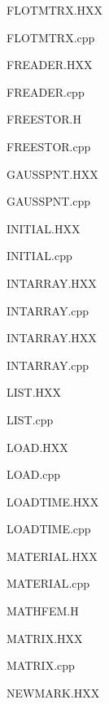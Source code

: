 \documentclass{article}
\begin{document}

% 
{\centering\sf  FLOTMTRX.HXX\\}

{\centering\sf  FLOTMTRX.cpp\\}

% 
{\centering\sf  FREADER.HXX\\}

{\centering\sf  FREADER.cpp\\}

% 
{\centering\sf  FREESTOR.H\\}

{\centering\sf  FREESTOR.cpp\\}

% 
{\centering\sf  GAUSSPNT.HXX\\}

{\centering\sf  GAUSSPNT.cpp\\}

% 
{\centering\sf  INITIAL.HXX\\}

{\centering\sf  INITIAL.cpp\\}

% 
{\centering\sf  INTARRAY.HXX\\}

{\centering\sf  INTARRAY.cpp\\}

% 
{\centering\sf  INTARRAY.HXX\\}

{\centering\sf  INTARRAY.cpp\\}

% 
{\centering\sf  LIST.HXX\\}

{\centering\sf  LIST.cpp\\}

% 
{\centering\sf  LOAD.HXX\\}

{\centering\sf  LOAD.cpp\\}

% 
{\centering\sf  LOADTIME.HXX\\}

{\centering\sf  LOADTIME.cpp\\}

% 
{\centering\sf  MATERIAL.HXX\\}

{\centering\sf  MATERIAL.cpp\\}

% 
{\centering\sf  MATHFEM.H\\}

% 
{\centering\sf  MATRIX.HXX\\}

{\centering\sf  MATRIX.cpp\\}

% 
{\centering\sf  NEWMARK.HXX\\}
\end{document}
